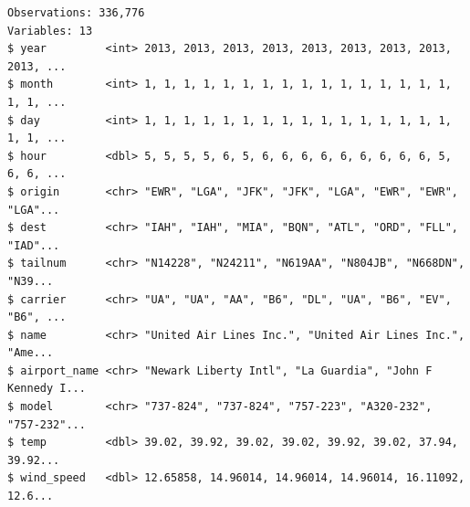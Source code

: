 \documentclass[
  11pt,
]{krantz}
\newenvironment{Shaded}{\begin{snugshade}}{\end{snugshade}}
\newcommand{\CommentTok}[1]{\textcolor[rgb]{0.37,0.37,0.37}{\textit{#1}}}
\newcommand{\DataTypeTok}[1]{\textcolor[rgb]{0.27,0.27,0.27}{#1}}
\newcommand{\KeywordTok}[1]{\textcolor[rgb]{0.27,0.27,0.27}{\textbf{#1}}}
\newcommand{\NormalTok}[1]{#1}
\newcommand{\OperatorTok}[1]{\textcolor[rgb]{0.43,0.43,0.43}{\textbf{#1}}}
\newcommand{\StringTok}[1]{\textcolor[rgb]{0.5,0.5,0.5}{#1}}
\begin{document}
\begin{Shaded}
\end{Shaded}

\begin{verbatim}
Observations: 336,776
Variables: 13
$ year         <int> 2013, 2013, 2013, 2013, 2013, 2013, 2013, 2013, 2013, ...
$ month        <int> 1, 1, 1, 1, 1, 1, 1, 1, 1, 1, 1, 1, 1, 1, 1, 1, 1, 1, ...
$ day          <int> 1, 1, 1, 1, 1, 1, 1, 1, 1, 1, 1, 1, 1, 1, 1, 1, 1, 1, ...
$ hour         <dbl> 5, 5, 5, 5, 6, 5, 6, 6, 6, 6, 6, 6, 6, 6, 6, 5, 6, 6, ...
$ origin       <chr> "EWR", "LGA", "JFK", "JFK", "LGA", "EWR", "EWR", "LGA"...
$ dest         <chr> "IAH", "IAH", "MIA", "BQN", "ATL", "ORD", "FLL", "IAD"...
$ tailnum      <chr> "N14228", "N24211", "N619AA", "N804JB", "N668DN", "N39...
$ carrier      <chr> "UA", "UA", "AA", "B6", "DL", "UA", "B6", "EV", "B6", ...
$ name         <chr> "United Air Lines Inc.", "United Air Lines Inc.", "Ame...
$ airport_name <chr> "Newark Liberty Intl", "La Guardia", "John F Kennedy I...
$ model        <chr> "737-824", "737-824", "757-223", "A320-232", "757-232"...
$ temp         <dbl> 39.02, 39.92, 39.02, 39.02, 39.92, 39.02, 37.94, 39.92...
$ wind_speed   <dbl> 12.65858, 14.96014, 14.96014, 14.96014, 16.11092, 12.6...
\end{verbatim}
\end{document}
